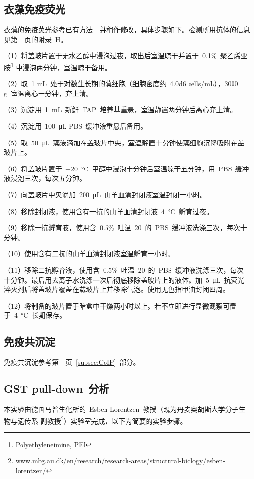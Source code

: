 \subsection{衣藻免疫荧光}
衣藻的免疫荧光参考已有方法\ \citep{Wykoff1999,Wood2012,Kusnier2006,LeDizet1986,Deane2001}\ 并稍作修改，具体步骤如下。检测所用抗体的信息见第\ \pageref{appen:H}\ 页的附录\ H。

（1）将盖玻片置于无水乙醇中浸泡过夜，取出后室温晾干并置于\ 0.1\%\ 聚乙烯亚胺\footnote{Polyethyleneimine, PEI} 中浸泡两分钟，室温晾干备用。

（2）取\ 1 mL\ 处于对数生长期的藻细胞（细胞密度约\ \num{4.0d6} cells/mL），3000 g\ 室温离心一分钟，弃上清。

（3）沉淀用\ \SI{1}{\mL}\ 新鲜\ TAP\ 培养基重悬，室温静置两分钟后离心弃上清。

（4）沉淀用\ \SI{100}{\uL} PBS\ 缓冲液重悬后备用。

（5）取\ \SI{50}{\uL}\ 藻液滴加在盖玻片中央，室温静置十分钟使藻细胞沉降吸附在盖玻片上。

（6）将盖玻片置于\ \SI{-20}{\degreeCelsius}\ 甲醇中浸泡十分钟后室温晾干五分钟，用\ PBS\ 缓冲液浸泡三次，每次五分钟。

（7）向盖玻片中央滴加\ \SI{200}{\uL}\ 山羊血清封闭液室温封闭一小时。

（8）移除封闭液，使用含有一抗的山羊血清封闭液\ \SI{4}{\degreeCelsius}\ 孵育过夜。

（9）移除一抗孵育液，使用含\ 0.5\%\ 吐温\ 20\ 的\ PBS\ 缓冲液洗涤三次，每次十分钟。

（10）使用含有二抗的山羊血清封闭液室温孵育一小时。

（11）移除二抗孵育液，使用含\ 0.5\%\ 吐温\ 20\ 的\ PBS\ 缓冲液洗涤三次，每次十分钟。最后用去离子水洗涤一次后彻底移除盖玻片上的液体。加\ \SI{5}{\uL}\ 抗荧光淬灭剂后将盖玻片覆盖在载玻片上并移除气泡。使用无色指甲油封闭四周。

（12）将制备的玻片置于暗盒中干燥两小时以上。若不立即进行显微观察可置于\ \SI{4}{\degreeCelsius}\ 长期保存。

\subsection{免疫共沉淀}
免疫共沉淀参考第\ \pageref{subsec:CoIP}\ 页\ \ref{subsec:CoIP}\ 部分。

\subsection{GST pull-down\ 分析}
本实验由德国马普生化所的\ Esben Lorentzen\ 教授（现为丹麦奥胡斯大学分子生物与遗传系
副教授\footnote{www.mbg.au.dk/en/research/research-areas/structural-biology/esben-lorentzen/}）实验室完成，以下为简要的实验步骤。

